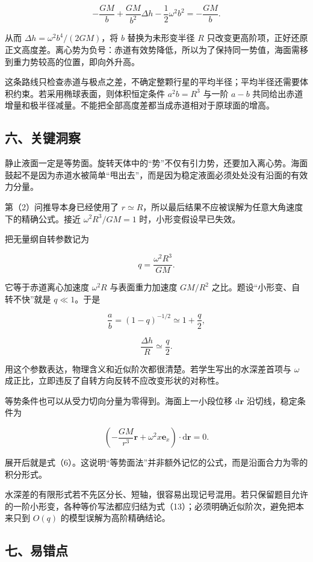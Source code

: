 \documentclass[12pt,a4paper,UTF8]{ctexart}
\begin{document}
\[-\frac{GM}{b}+\frac{GM}{b^2}\Delta h-\frac12\omega^2b^2=-\frac{GM}{b}.\]

从而 \(\Delta h=\omega^2b^4/(2GM)\)，将 \(b\) 替换为未形变半径 \(R\)
只改变更高阶项，正好还原正文高度差。离心势为负号：赤道有效势降低，所以为了保持同一势值，海面需移到重力势较高的位置，即向外升高。

这条路线只检查赤道与极点之差，不确定整颗行星的平均半径；平均半径还需要体积约束。若采用椭球表面，则体积恒定条件
\(a^2b=R^3\) 与一阶 \(a-b\)
共同给出赤道增量和极半径减量。不能把全部高度差都当成赤道相对于原球面的增高。

\subsection{六、关键洞察}\label{ux516dux5173ux952eux6d1eux5bdf-5}

静止液面一定是等势面。旋转天体中的``势''不仅有引力势，还要加入离心势。海面鼓起不是因为赤道水被简单``甩出去''，而是因为稳定液面必须处处没有沿面的有效力分量。

第（2）问推导本身已经使用了
\(r\simeq R\)，所以最后结果不应被误解为任意大角速度下的精确公式。接近
\(\omega^2R^3/GM=1\) 时，小形变假设早已失效。

把无量纲自转参数记为

\[
q=\frac{\omega^2R^3}{GM}.
\]

它等于赤道离心加速度 \(\omega^2R\) 与表面重力加速度 \(GM/R^2\)
之比。题设``小形变、自转不快''就是 \(q\ll1\)。于是

\[
\frac ab=(1-q)^{-1/2}
\simeq1+\frac q2,
\]

\[
\frac{\Delta h}{R}\simeq\frac q2.
\]

用这个参数表达，物理含义和近似阶次都很清楚。若学生写出的水深差首项与
\(\omega\) 成正比，立即违反了自转方向反转不应改变形状的对称性。

等势条件也可以从受力切向分量为零得到。海面上一小段位移
\(\mathrm d\bm r\) 沿切线，稳定条件为

\[
\left(
-\frac{GM}{r^3}\bm r
+\omega^2x\bm e_x
\right)\cdot\mathrm d\bm r=0.
\]

展开后就是式（6）。这说明``等势面法''并非额外记忆的公式，而是沿面合力为零的积分形式。

水深差的有限形式若不先区分长、短轴，很容易出现记号混用。若只保留题目允许的一阶小形变，各种等价写法都应归结为式（13）；必须明确近似阶次，避免把本来只到
\(O(q)\) 的模型误解为高阶精确结论。

\subsection{七、易错点}\label{ux4e03ux6613ux9519ux70b9-5}
\end{document}
